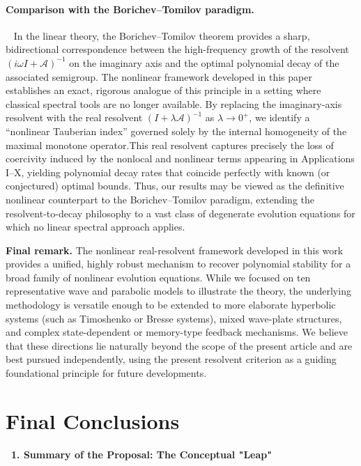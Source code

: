 \documentclass[11pt,reqno]{amsart}
\theoremstyle{remark}
\begin{document}
\paragraph{Comparison with the Borichev--Tomilov paradigm.}~
In the linear theory, the Borichev--Tomilov theorem provides a sharp, bidirectional correspondence between the high-frequency growth of the resolvent $(i\omega I + \mathcal{A})^{-1}$ on the imaginary axis and the optimal polynomial decay of the associated semigroup. The nonlinear framework developed in this paper establishes an exact, rigorous analogue of this principle in a setting where classical spectral tools are no longer available. By replacing the imaginary-axis resolvent with the real resolvent $(I + \lambda\mathcal{A})^{-1}$ as $\lambda \to 0^+$, we identify a ``nonlinear Tauberian index'' governed solely by the internal homogeneity of the maximal monotone operator.This real resolvent captures precisely the loss of coercivity induced by the nonlocal and nonlinear terms appearing in Applications I--X, yielding polynomial decay rates that coincide perfectly with known (or conjectured) optimal bounds. Thus, our results may be viewed as the definitive nonlinear counterpart to the Borichev--Tomilov paradigm, extending the resolvent-to-decay philosophy to a vast class of degenerate evolution equations for which no linear spectral approach applies.

\medskip\noindent\textbf{Final remark.}
The nonlinear real-resolvent framework developed in this work provides a unified, highly robust mechanism to recover polynomial stability for a broad family of nonlinear evolution equations. While we focused on ten representative wave and parabolic models to illustrate the theory, the underlying methodology is versatile enough to be extended to more elaborate hyperbolic systems (such as Timoshenko or Bresse systems), mixed wave-plate structures, and complex state-dependent or memory-type feedback mechanisms. We believe that these directions lie naturally beyond the scope of the present article and are best pursued independently, using the present resolvent criterion as a guiding foundational principle for future developments.


\section{Final Conclusions}

\medskip
{\bf ~1. Summary of the Proposal: The Conceptual "Leap"}

\medskip
\end{document}
